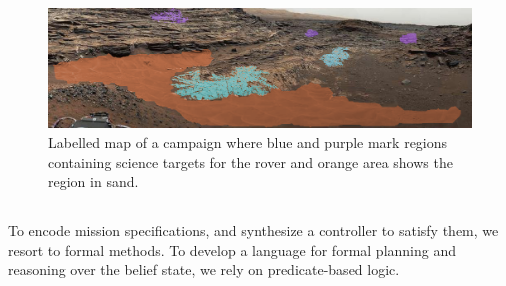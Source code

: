\documentclass[letterpaper]{article} %
\begin{document}
    
	\begin{figure}[t!]
    	\centering
    	\includegraphics[width=1.7\columnwidth]{figs/MarsLabelledWithSand.png}
    	\caption{Labelled map of a %
    	campaign where blue and purple mark regions containing science targets for the rover and orange area shows the region in sand.}
    	\label{fig:Scenario}
    \end{figure}
    
	\subsection{\DTL}\label{sec:DTL}
    To encode mission specifications, and synthesize a controller to satisfy them, we resort to formal methods. To develop a language for formal planning and reasoning over the belief state, we rely on predicate-based logic.
    
    
    
\end{document}
